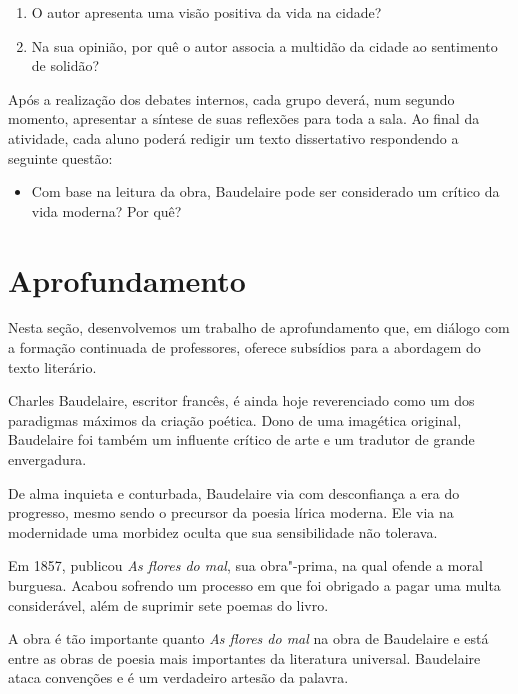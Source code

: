 \documentclass[12pt]{extarticle}
\begin{document}
\begin{enumerate}
\item O autor apresenta uma visão positiva da vida na cidade?
\item Na sua opinião, por quê o autor associa a multidão da cidade ao sentimento de solidão?
\end{enumerate}

Após a realização dos debates internos, cada grupo deverá, num segundo momento, apresentar a síntese de suas reflexões para toda a sala. Ao final da atividade, cada aluno poderá redigir um texto dissertativo respondendo a seguinte questão:

\begin{itemize}
\item Com base na leitura da obra, Baudelaire pode ser considerado um crítico da vida moderna? Por quê?
\end{itemize}

\section{Aprofundamento}

Nesta seção, desenvolvemos um trabalho de aprofundamento que, em diálogo
com a formação continuada de professores, oferece subsídios para a
abordagem do texto literário.

Charles Baudelaire, escritor francês, é ainda hoje reverenciado como
um dos paradigmas máximos da criação poética.
Dono de uma imagética original, Baudelaire foi também um influente
crítico de arte e um tradutor de grande envergadura.

De alma inquieta e conturbada, Baudelaire via com desconfiança a era do
progresso, mesmo sendo o precursor da poesia lírica moderna.
Ele via na modernidade uma morbidez oculta que sua sensibilidade não
tolerava.


 

Em 1857, publicou \textit{As flores do mal},
sua obra"-prima, na qual ofende a moral burguesa. Acabou sofrendo um
processo em que foi obrigado a pagar uma multa considerável, além de
suprimir sete poemas do livro.

A obra é tão importante quanto \textit{As flores do mal} na obra de
Baudelaire e está entre as obras de poesia mais importantes da
literatura universal.
Baudelaire ataca convenções e é um verdadeiro artesão da palavra.
\end{document}
